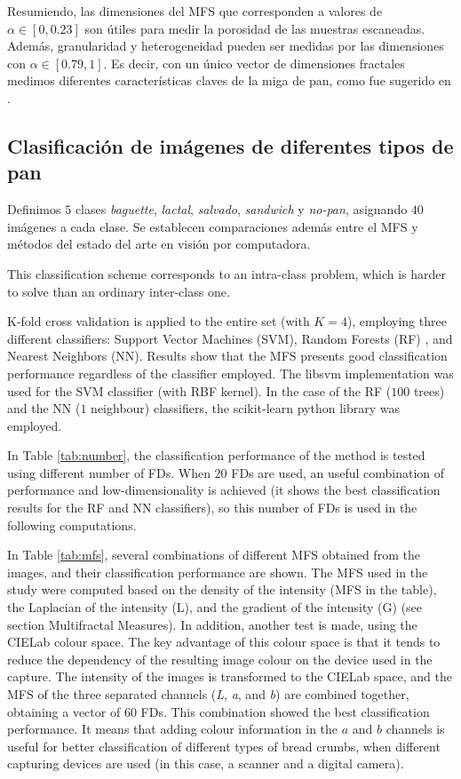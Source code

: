 \documentclass[spanish,a4paper,openright,11pt]{book}
\begin{document}
Resumiendo, las dimensiones del MFS que corresponden a valores de  $\alpha \in [0,0.23]$ son útiles para medir la porosidad de las muestras escaneadas. Además, granularidad y heterogeneidad pueden ser medidas por las dimensiones con  $\alpha \in [0.79,1]$. Es decir, con un único vector de dimensiones fractales medimos diferentes características claves de la miga de pan, como fue sugerido en \cite{Gonzales2008}.

\subsection{Clasificaci\'on de imágenes de diferentes tipos de pan}

Definimos $5$ clases {\em baguette}, {\em lactal}, {\em salvado}, {\em sandwich} y {\em no-pan}, asignando $40$ imágenes a cada clase.  Se establecen comparaciones además entre el MFS y métodos del estado del arte en visión por computadora.

This classification scheme corresponds to an intra-class problem, which is harder to solve than an ordinary inter-class one. 

K-fold cross validation is applied to the entire set (with $K=4$), employing three different classifiers: Support Vector Machines (SVM), Random Forests (RF) \cite{Breiman2001}, and Nearest Neighbors (NN). Results show that the MFS presents good classification performance regardless of the classifier employed. The \textsf{libsvm} implementation \cite{Chang2011} was used for the SVM classifier (with RBF kernel). In the case of the RF ($100$ trees) and the NN ($1$ neighbour) classifiers, the \textsf{scikit-learn} python library was employed.

In Table \ref{tab:number}, the classification performance of the method is tested using different number of FDs. When $20$ FDs are used, an useful combination of performance and low-di\-men\-sio\-na\-li\-ty is achieved (it shows the best classification results for the RF and NN classifiers), so this number of FDs is used in the following computations. 

In Table \ref{tab:mfs}, several combinations of different MFS obtained from the images, and their classification performance are shown. The MFS used in the study were computed based on the density of the intensity (MFS in the table), the Laplacian of the intensity (L), and the gradient of the intensity (G) (see section Multifractal Measures). In addition, another test is made, using the CIELab \cite{Hunter58} colour space. The key advantage of this colour space is that it tends to reduce the dependency of the resulting image colour on the device used in the capture. The intensity of the images is transformed to the CIELab space, and the MFS of the three separated channels ({\em L}, {\em a}, and {\em b}) are combined together, obtaining a vector of $60$ FDs. This combination showed the best classification performance. It means that adding colour information in the $a$ and $b$ channels is useful for better classification of different types of bread crumbs, when different capturing devices are used (in this case, a scanner and a digital camera).
\end{document}
